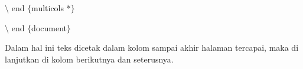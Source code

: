 \vspace{\baselineskip}
\noindent \hspace*{0.5in}$\setminus$ end $ \{ $multicols *$ \} $\par

\vspace{\baselineskip}
\noindent \hspace*{0.5in}$\setminus$ end $ \{ $document$ \} $\par

\vspace{\baselineskip}
\noindent Dalam hal ini teks dicetak dalam kolom sampai akhir halaman tercapai, maka di lanjutkan di kolom berikutnya dan seterusnya.\par
